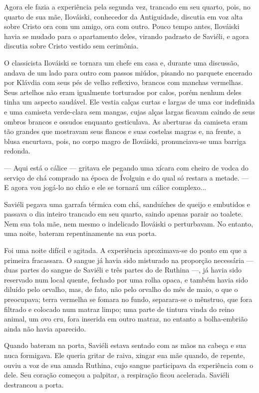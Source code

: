 Agora ele fazia a experiência pela segunda vez, trancado em seu quarto,
pois, no quarto de sua mãe, Ilováiski, conhecedor da Antiguidade,
discutia em voz alta sobre Cristo ora com um amigo, ora com outro. Pouco
tempo antes, Ilováiski havia se mudado para o apartamento deles, virando
padrasto de Saviéli, e agora discutia sobre Cristo vestido sem
cerimônia.

O classicista Ilováiski se tornara um chefe em casa e, durante uma
discussão, andava de um lado para outro com passos miúdos, pisando no
parquete encerado por Klávdia com seus pés de velho reflexivo, brancos
com manchas vermelhas. Seus artelhos não eram igualmente torturados por
calos, porém nenhum deles tinha um aspecto saudável. Ele vestia calças
curtas e largas de uma cor indefinida e uma camiseta verde-clara sem
mangas, cujas alças largas ficavam caindo de seus ombros brancos e
ossudos enquanto gesticulava. As aberturas da camiseta eram tão grandes
que mostravam seus flancos e suas costelas magras e, na frente, a blusa
encurtava, pois, no corpo magro de Ilováiski, pronunciava-se uma barriga
redonda.

--- Aqui está o cálice --- gritava ele pegando uma xícara com cheiro de
vodca do serviço de chá comprado na época de Ívolguin e do qual só
restara a metade. --- E agora vou jogá-lo no chão e ele se tornará um
cálice complexo...

Saviéli pegava uma garrafa térmica com chá, sanduíches de queijo e
embutidos e passava o dia inteiro trancado em seu quarto, saindo apenas
parair ao toalete. Nem sua tola mãe, nem mesmo o indelicado Ilováiski o
perturbavam. No entanto, uma noite, bateram repentinamente na sua porta.

Foi uma noite difícil e agitada. A experiência aproximava-se do ponto em
que a primeira fracassara. O sangue já havia sido misturado na proporção
necessária --- duas partes do sangue de Saviéli e três partes do de
Ruthina ---, já havia sido reservado num local quente, fechado por uma
rolha opaca, e também havia sido diluído pelo orvalho, mas, de fato, não
pelo orvalho do mês de maio, o que o preocupava; terra vermelha se
fomara no fundo, separara-se o mênstruo, que fora filtrado e colocado
num matraz limpo; uma parte de tintura vinda do reino animal, um ovo
cru, fora inserida em outro matraz, no entanto a bolha-embrião ainda não
havia aparecido.

Quando bateram na porta, Saviéli estava sentado com as mãos na cabeça e
sua nuca formigava. Ele queria gritar de raiva, xingar sua mãe quando,
de repente, ouviu a voz de sua amada Ruthina, cujo sangue participava da
experiência com o dele. Seu coração começou a palpitar, a respiração
ficou acelerada. Saviéli destrancou a porta.


